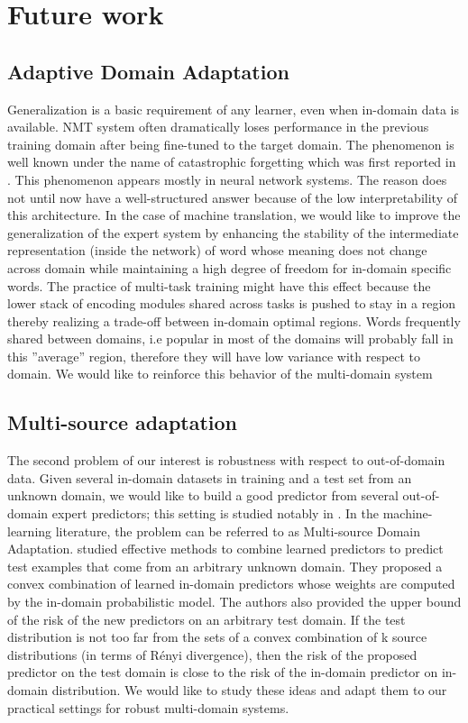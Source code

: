\documentclass[12pt,a4paper,twoside]{report}
\theoremstyle{definition}
\begin{document}
\section*{Future work}
\subsection*{Adaptive Domain Adaptation}
Generalization is a basic requirement of any learner, even when in-domain data is available. NMT system often dramatically loses performance in the previous training domain after being fine-tuned to the target domain. The phenomenon is well known under the name of catastrophic forgetting which was first reported in \cite{Michael89catastrophic}. This phenomenon appears mostly in neural network systems. The reason does not until now have a well-structured answer because of the low interpretability of this architecture. In the case of machine translation, we would like to improve the generalization of the expert
system by enhancing the stability of the intermediate representation (inside the network) of word whose meaning does not change across domain while maintaining a high degree of freedom for in-domain specific words. The practice of multi-task training might have
this effect because the lower stack of encoding modules shared across tasks is pushed to stay in a region thereby realizing a trade-off between in-domain optimal regions. Words frequently shared between domains, i.e popular in most of the domains will probably fall in
this ”average” region, therefore they will have low variance with respect to domain. We would like to reinforce this behavior of the multi-domain system 

\subsection*{Multi-source adaptation}
The second problem of our interest is robustness with respect to out-of-domain data. Given several in-domain datasets in training and a test set from an unknown domain, we would like to build a good predictor from several out-of-domain expert predictors; this setting is studied notably in \citep{hoffman18algorithms}. In the machine-learning literature, the problem can be referred to as Multi-source Domain Adaptation. \cite{yishay09multiple,mansour09domain} studied effective methods to combine learned predictors to predict test examples that come from an arbitrary unknown domain. They proposed a convex combination of learned in-domain predictors whose weights are computed by the in-domain probabilistic model. The authors also provided the upper bound of the risk of the new predictors on an arbitrary test domain. If the test distribution is not too far from the sets of a convex combination of k source distributions (in terms of Rényi divergence), then the risk of the proposed predictor on the test domain is close to the risk of the in-domain predictor on in-domain distribution. We would like to study these ideas and adapt them to our practical settings for robust multi-domain systems.
\end{document}

